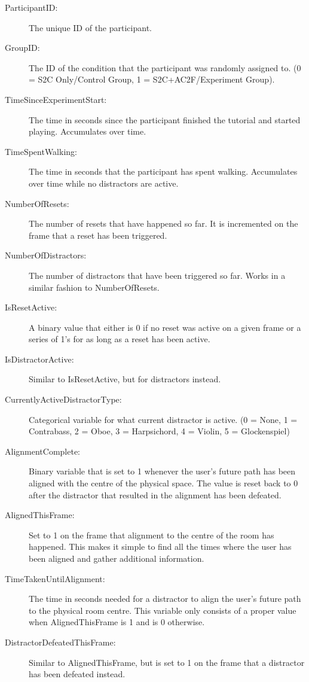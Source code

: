\begin{description}
   \item[ParticipantID:] The unique ID of the participant.
   \item[GroupID:] The ID of the condition that the participant was randomly assigned to. (0 = S2C Only/Control Group, 1 = S2C+AC2F/Experiment Group).
   \item[TimeSinceExperimentStart:] The time in seconds since the participant finished the tutorial and started playing. Accumulates over time. 
   \item[TimeSpentWalking:] The time in seconds that the participant has spent walking. Accumulates over time while no distractors are active. 
   \item[NumberOfResets:] The number of resets that have happened so far. It is incremented on the frame that a reset has been triggered. 
   \item[NumberOfDistractors:] The number of distractors that have been triggered so far. Works in a similar fashion to NumberOfResets.
   \item[IsResetActive:] A binary value that either is 0 if no reset was active on a given frame or a series of 1's for as long as a reset has been active. 
   \item[IsDistractorActive:] Similar to IsResetActive, but for distractors instead.
   \item[CurrentlyActiveDistractorType:] Categorical variable for what current distractor is active. (0 = None, 1 = Contrabass, 2 = Oboe, 3 = Harpsichord, 4 = Violin, 5 = Glockenspiel)
   \item[AlignmentComplete:] Binary variable that is set to 1 whenever the user's future path has been aligned with the centre of the physical space. The value is reset back to 0 after the distractor that resulted in the alignment has been defeated. 
   \item[AlignedThisFrame:] Set to 1 on the frame that alignment to the centre of the room has happened. This makes it simple to find all the times where the user has been aligned and gather additional information.
   \item[TimeTakenUntilAlignment:] The time in seconds needed for a distractor to align the user's future path to the physical room centre. This variable only consists of a proper value when AlignedThisFrame is 1 and is 0 otherwise. 
   \item[DistractorDefeatedThisFrame:] Similar to AlignedThisFrame, but is set to 1 on the frame that a distractor has been defeated instead. 

\end{description}

